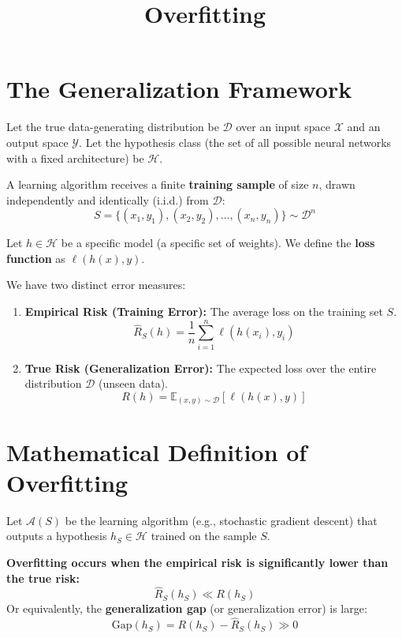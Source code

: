 \documentclass[11pt]{article}
\title{Overfitting}
\author{}
\date{}
\begin{document}
\maketitle

\section{The Generalization Framework}

Let the true data-generating distribution be \(\mathcal{D}\) over an input space \(\mathcal{X}\) and an output space \(\mathcal{Y}\). 
Let the hypothesis class (the set of all possible neural networks with a fixed architecture) be \(\mathcal{H}\).

A learning algorithm receives a finite \textbf{training sample} of size \(n\), drawn independently and identically (i.i.d.) from \(\mathcal{D}\):
\[
 S = \{(x_1, y_1), (x_2, y_2), \dots, (x_n, y_n)\} \sim \mathcal{D}^n 
\]

Let \(h \in \mathcal{H}\) be a specific model (a specific set of weights). We define the \textbf{loss function} as \(\ell(h(x), y)\). 

We have two distinct error measures:

\begin{enumerate}
    \item \textbf{Empirical Risk (Training Error):} The average loss on the training set \(S\).
    \[
     \hat{R}_S(h) = \frac{1}{n} \sum_{i=1}^n \ell(h(x_i), y_i) 
    \]
    \item \textbf{True Risk (Generalization Error):} The expected loss over the entire distribution \(\mathcal{D}\) (unseen data).
    \[
     R(h) = \mathbb{E}_{(x,y) \sim \mathcal{D}} [\ell(h(x), y)] 
    \]
\end{enumerate}

\hrulefill

\section{Mathematical Definition of Overfitting}

Let \(\mathcal{A}(S)\) be the learning algorithm (e.g., stochastic gradient descent) that outputs a hypothesis \(h_S \in \mathcal{H}\) trained on the sample \(S\). 

\textbf{Overfitting occurs when the empirical risk is significantly lower than the true risk:}
\[
 \hat{R}_S(h_S) \ll R(h_S) 
\]
Or equivalently, the \textbf{generalization gap} (or generalization error) is large:
\[
 \text{Gap}(h_S) = R(h_S) - \hat{R}_S(h_S) \gg 0 
\]
\end{document}
